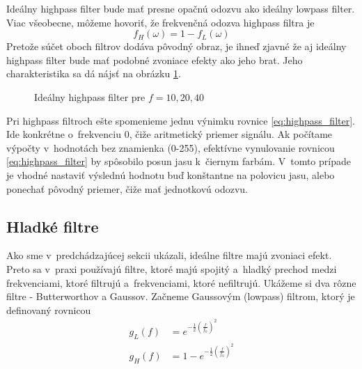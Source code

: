Ideálny highpass filter bude mať presne opačnú odozvu ako ideálny
lowpass filter. Viac všeobecne, môžeme hovoriť, že frekvenčná odozva
highpass filtra je
\begin{equation}
    f_H(\omega) = 1 - f_L(\omega)
    \label{eq:highpass_filter}
\end{equation}
Pretože súčet oboch filtrov dodáva pôvodný obraz, je ihneď zjavné že
aj ideálny highpass filter bude mať podobné zvoniace efekty ako jeho
brat. Jeho charakteristika sa dá nájsť na obrázku
\ref{fig:ideal_highpass_filter}.

\begin{figure}[htp]
    \def\path{obrazky/informatika/digitalne_filtre}
    \centering
    \caption{Ideálny highpass filter pre $f=10,20,40$}
    \label{fig:ideal_highpass_filter}
\end{figure}

Pri highpass filtroch ešte spomenieme jednu výnimku rovnice
\eqref{eq:highpass_filter}. Ide konkrétne o~frekvenciu 0, čiže
aritmetický priemer signálu.
Ak počítame výpočty v~hodnotách bez znamienka (0-255), efektívne
vynulovanie rovnicou \eqref{eq:highpass_filter} by spôsobilo posun jasu
k~čiernym farbám. V~tomto prípade je vhodné nastaviť výslednú hodnotu
buď konštantne na polovicu jasu, alebo ponechať pôvodný priemer, čiže
mať jednotkovú odozvu.

\subsection{Hladké filtre}
Ako sme v~predchádzajúcej sekcii ukázali, ideálne filtre majú zvoniaci
efekt. Preto sa v~praxi používajú filtre, ktoré majú spojitý a~hladký
prechod medzi frekvenciami, ktoré filtrujú a~frekvenciami, ktoré
nefiltrujú. Ukážeme si dva rôzne filtre - Butterworthov a Gaussov.
Začneme Gaussovým (lowpass) filtrom, ktorý je definovaný rovnicou
\begin{align*}
g_L(f) &= e^{- \frac{1}{2} (\frac{f}{f_0})^2} \\
g_H(f) &= 1 - e^{- \frac{1}{2} (\frac{f}{f_0})^2}
\end{align*}

